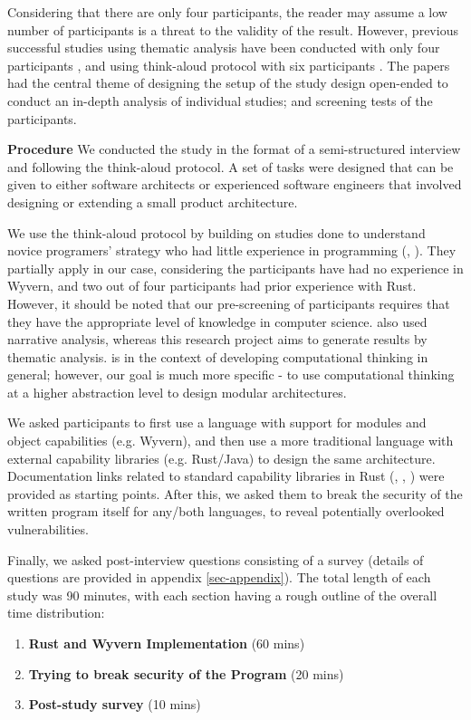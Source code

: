 Considering that there are only four participants, the reader may assume a low number of participants is a threat to the validity of the result. However, previous successful studies using thematic analysis have been conducted with only four participants \cite{Huang2023}, and using think-aloud protocol with six participants \cite{whalley2014qualitative}. The papers had the central theme of designing the setup of the study design open-ended to conduct an in-depth analysis of individual studies; and screening tests of the participants. 

\noindent
\textbf{Procedure}  We conducted the study in the format of a semi-structured interview and following the think-aloud protocol. A set of tasks were designed that can be given to either software architects or experienced software engineers that involved designing or extending a small product architecture. 

We use the think-aloud protocol by building on studies done to understand novice programers' strategy who had little experience in programming (\cite{whalley2014qualitative},  \cite{lye2014review}). They partially apply in our case, considering the participants have had no experience in Wyvern, and two out of four participants had prior experience with Rust. However, it should be noted that our pre-screening of participants requires that they have the appropriate level of knowledge in computer science. \cite{whalley2014qualitative} also used narrative analysis, whereas this research project aims to generate results by thematic analysis. \cite{lye2014review} is in the context of developing computational thinking in general; however, our goal is much more specific - to use computational thinking at a higher abstraction level to design modular architectures.

We asked participants to first use a language with support for modules and object capabilities (e.g. Wyvern), and then use a more traditional language with external capability libraries (e.g. Rust/Java) to design the same architecture. Documentation links related to standard capability libraries in Rust (\cite{libcaprust}, \cite{libcapdirrust}, \cite{librust}) were provided as starting points. After this, we asked them to break the security of the written program itself for any/both languages, to reveal potentially overlooked vulnerabilities. 

Finally, we asked post-interview questions consisting of a survey (details of questions are provided in appendix \ref{sec-appendix}). The total length of each study was 90 minutes, with each section having a rough outline of the overall time distribution:
\begin{enumerate}
    \item \textbf{Rust and Wyvern Implementation} (60 mins)
    \item \textbf{Trying to break security of the Program} (20 mins)
    \item \textbf{Post-study survey} (10 mins)
\end{enumerate}


